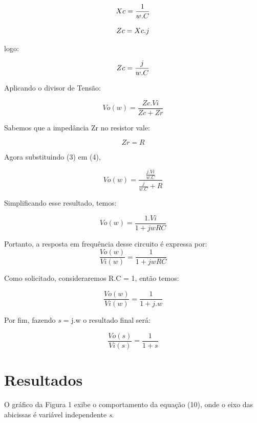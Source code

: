 \documentclass[12pt]{article}
\begin{document}
\begin{equation}
Xc = \frac{1}{w.C}\\
\end{equation}

\begin{equation}
Zc = Xc.j\\
\end{equation}

logo:

\begin{equation}
Zc = \frac{j}{w.C}\\
\end{equation}

Aplicando o divisor de Tensão:

\begin{equation}
Vo(w)=\frac{Zc.Vi}{Zc+Zr}
\end{equation}

Sabemos que a impedância Zr no resistor vale:

\begin{equation}
Zr= R
\end{equation}


Agora substituindo (3) em (4), 

\begin{equation}
Vo(w)=\frac{\frac{j.Vi}{w.C}}{\frac{j}{w.C} + R}
\end{equation}

Simplificando esse resultado, temos: 

\begin{equation}
Vo(w)=\frac{1.Vi}{1+jwRC}
\end{equation}

Portanto, a resposta em frequência desse circuito é expressa por:
\begin{equation}
\frac{Vo(w)}{Vi(w)}=\frac{1}{1+jwRC}
\end{equation}

Como solicitado, consideraremos R.C = 1, então temos:

\begin{equation}
\frac{Vo(w)}{Vi(w)}=\frac{1}{1+j.w}
\end{equation}

Por fim, fazendo \textit{s} = j.w o resultado final será:

\begin{equation}
\frac{Vo(s)}{Vi(s)}=\frac{1}{1+\textit{s}}
\end{equation}

\section{Resultados}
O gráfico da Figura 1 exibe o comportamento da equação (10), onde o eixo das abicissas é variável independente  \textit{s}. 
\end{document}

